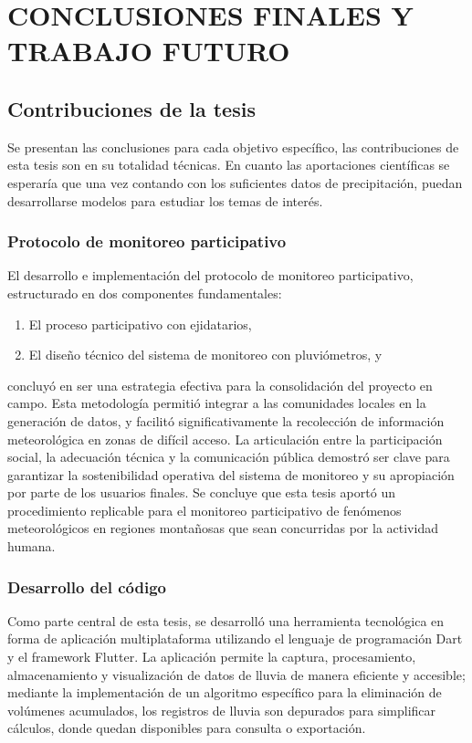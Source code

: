 \chapter{CONCLUSIONES FINALES Y TRABAJO FUTURO}
\section{Contribuciones de la tesis}
Se presentan las conclusiones para cada objetivo específico, las contribuciones de esta tesis son en su totalidad técnicas. En cuanto las aportaciones científicas se esperaría que una vez contando con los suficientes datos de precipitación, puedan desarrollarse modelos para estudiar los temas de interés. 
\subsection{Protocolo de monitoreo participativo}
El desarrollo e implementación del protocolo de monitoreo participativo, estructurado en dos componentes fundamentales:

\begin{enumerate}
  \item El proceso participativo con ejidatarios,
  \item El diseño técnico del sistema de monitoreo con pluviómetros, y
\end{enumerate}

concluyó en ser una estrategia efectiva para la consolidación del proyecto en campo. Esta metodología permitió integrar a las comunidades locales en la generación de datos, y facilitó significativamente la recolección de información meteorológica en zonas de difícil acceso. La articulación entre la participación social, la adecuación técnica y la comunicación pública demostró ser clave para garantizar la sostenibilidad operativa del sistema de monitoreo y su apropiación por parte de los usuarios finales. Se concluye que esta tesis aportó un procedimiento replicable para el monitoreo participativo de fenómenos meteorológicos en regiones montañosas que sean concurridas por la actividad humana.


\subsection{Desarrollo del código}

Como parte central de esta tesis, se desarrolló una herramienta tecnológica en forma de aplicación multiplataforma utilizando el lenguaje de programación Dart y el framework Flutter. La aplicación permite la captura, procesamiento, almacenamiento y visualización de datos de lluvia de manera eficiente y accesible; mediante la implementación de un algoritmo específico para la eliminación de volúmenes acumulados, los registros de lluvia son depurados para simplificar cálculos, donde quedan disponibles para consulta o exportación.

